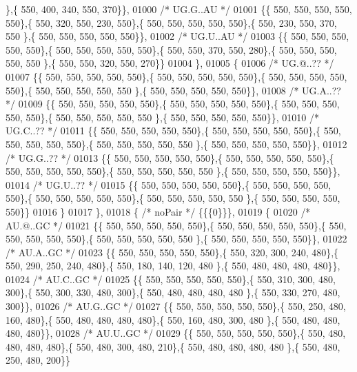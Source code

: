 \begin{DoxyCode}
      \},\{ 550, 400, 340, 550, 370\}\},
01000 \textcolor{comment}{/* UG.G..AU */}
01001 \{\{ 550, 550, 550, 550, 550\},\{ 550, 320, 550, 230, 550\},\{ 550, 550, 550, 550, 550\},\{ 550, 230, 550, 370, 550
      \},\{ 550, 550, 550, 550, 550\}\},
01002 \textcolor{comment}{/* UG.U..AU */}
01003 \{\{ 550, 550, 550, 550, 550\},\{ 550, 550, 550, 550, 550\},\{ 550, 550, 370, 550, 280\},\{ 550, 550, 550, 550, 550
      \},\{ 550, 550, 320, 550, 270\}\}
01004 \},
01005 \{
01006 \textcolor{comment}{/* UG.@..?? */}
01007 \{\{ 550, 550, 550, 550, 550\},\{ 550, 550, 550, 550, 550\},\{ 550, 550, 550, 550, 550\},\{ 550, 550, 550, 550, 550
      \},\{ 550, 550, 550, 550, 550\}\},
01008 \textcolor{comment}{/* UG.A..?? */}
01009 \{\{ 550, 550, 550, 550, 550\},\{ 550, 550, 550, 550, 550\},\{ 550, 550, 550, 550, 550\},\{ 550, 550, 550, 550, 550
      \},\{ 550, 550, 550, 550, 550\}\},
01010 \textcolor{comment}{/* UG.C..?? */}
01011 \{\{ 550, 550, 550, 550, 550\},\{ 550, 550, 550, 550, 550\},\{ 550, 550, 550, 550, 550\},\{ 550, 550, 550, 550, 550
      \},\{ 550, 550, 550, 550, 550\}\},
01012 \textcolor{comment}{/* UG.G..?? */}
01013 \{\{ 550, 550, 550, 550, 550\},\{ 550, 550, 550, 550, 550\},\{ 550, 550, 550, 550, 550\},\{ 550, 550, 550, 550, 550
      \},\{ 550, 550, 550, 550, 550\}\},
01014 \textcolor{comment}{/* UG.U..?? */}
01015 \{\{ 550, 550, 550, 550, 550\},\{ 550, 550, 550, 550, 550\},\{ 550, 550, 550, 550, 550\},\{ 550, 550, 550, 550, 550
      \},\{ 550, 550, 550, 550, 550\}\}
01016 \}
01017 \},
01018 \{ \textcolor{comment}{/* noPair */} \{\{\{0\}\}\},
01019 \{
01020 \textcolor{comment}{/* AU.@..GC */}
01021 \{\{ 550, 550, 550, 550, 550\},\{ 550, 550, 550, 550, 550\},\{ 550, 550, 550, 550, 550\},\{ 550, 550, 550, 550, 550
      \},\{ 550, 550, 550, 550, 550\}\},
01022 \textcolor{comment}{/* AU.A..GC */}
01023 \{\{ 550, 550, 550, 550, 550\},\{ 550, 320, 300, 240, 480\},\{ 550, 290, 250, 240, 480\},\{ 550, 180, 140, 120, 480
      \},\{ 550, 480, 480, 480, 480\}\},
01024 \textcolor{comment}{/* AU.C..GC */}
01025 \{\{ 550, 550, 550, 550, 550\},\{ 550, 310, 300, 480, 300\},\{ 550, 300, 330, 480, 300\},\{ 550, 480, 480, 480, 480
      \},\{ 550, 330, 270, 480, 300\}\},
01026 \textcolor{comment}{/* AU.G..GC */}
01027 \{\{ 550, 550, 550, 550, 550\},\{ 550, 250, 480, 160, 480\},\{ 550, 480, 480, 480, 480\},\{ 550, 160, 480, 300, 480
      \},\{ 550, 480, 480, 480, 480\}\},
01028 \textcolor{comment}{/* AU.U..GC */}
01029 \{\{ 550, 550, 550, 550, 550\},\{ 550, 480, 480, 480, 480\},\{ 550, 480, 300, 480, 210\},\{ 550, 480, 480, 480, 480
      \},\{ 550, 480, 250, 480, 200\}\}

\end{DoxyCode}
